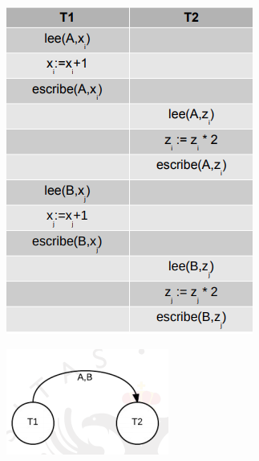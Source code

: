 \begin{figure}[H]
\centering
\begin{subfigure}{.5\textwidth}
  \centering
  \includegraphics[width=.7\linewidth]{img/37.png}
\end{subfigure}%
\begin{subfigure}{.6\textwidth}
  \centering
  \includegraphics[width=.4\linewidth]{img/38.png}
\end{subfigure}
\end{figure}


